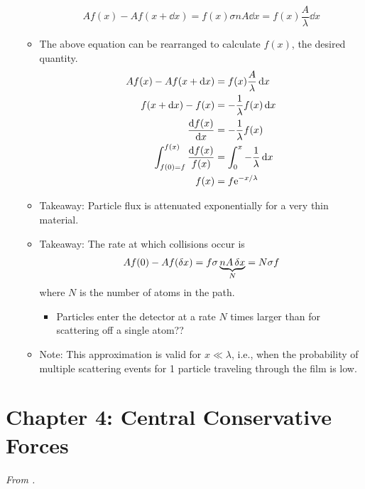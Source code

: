 \documentclass[../notes.tex]{subfiles}
\begin{document}
\begin{itemize}
\begin{itemize}
        \begin{equation*}
            Af(x)-Af(x+\dd{x}) = f(x)\sigma nA\dd{x} = f(x)\frac{A}{\lambda}\dd{x}
        \end{equation*}
        \item The above equation can be rearranged to calculate $f(x)$, the desired quantity.
        \begin{align*}
            Af(x)-Af(x+\dd{x}) &= f(x)\frac{A}{\lambda}\dd{x}\\
            f(x+\dd{x})-f(x) &= -\frac{1}{\lambda}f(x)\dd{x}\\
            \dv{f(x)}{x} &= -\frac{1}{\lambda}f(x)\\
            \int_{f(0)=f}^{f(x)}\frac{\dd{f(x)}}{f(x)} &= \int_0^x-\frac{1}{\lambda}\dd{x}\\
            f(x) &= f\e[-x/\lambda]
        \end{align*}
        \item Takeaway: Particle flux is attenuated exponentially for a very thin material.
        \item Takeaway: The rate at which collisions occur is
        \begin{equation*}
            Af(0)-Af(\var{x}) = f\sigma\underbrace{nA\var{x}}_N = N\sigma f
        \end{equation*}
        where $N$ is the number of atoms in the path.
        \begin{itemize}
            \item Particles enter the detector at a rate $N$ times larger than for scattering off a single atom??
        \end{itemize}
        \item Note: This approximation is valid for $x\ll\lambda$, i.e., when the probability of multiple scattering events for 1 particle traveling through the film is low.
    \end{itemize}
\end{itemize}



\section{Chapter 4: Central Conservative Forces}
\emph{From \textcite{bib:KibbleBerkshire}.}
\end{document}
